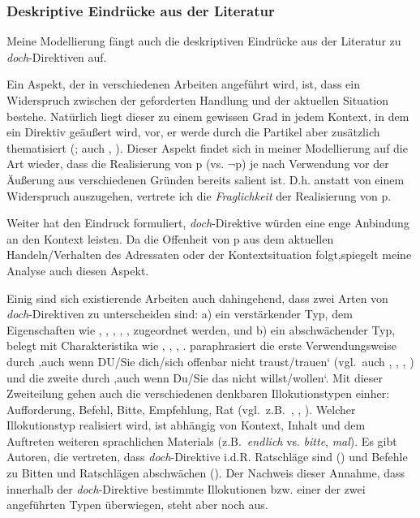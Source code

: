 \subsubsection{Deskriptive Eindrücke aus der Literatur}
Meine Modellierung fängt auch die deskriptiven Eindrücke aus der Literatur zu \textit{doch}-Direktiven auf. 

Ein Aspekt, der in verschiedenen Arbeiten angeführt wird, ist, dass ein Widerspruch zwischen der geforderten Handlung und der aktuellen Situation bestehe. Natürlich liegt dieser zu einem gewissen Grad in jedem Kontext, in dem ein Direktiv geäußert wird, vor, er werde durch die Partikel aber zusätzlich thematisiert (\citealt[139]{Hentschel1986}; auch \citealt[118]{Thurmair1989}, \citealt[214]{Kwon2005}). Dieser Aspekt findet sich in meiner Modellierung auf die Art wieder, dass die Realisierung von p (vs. $\neg$p) je nach Verwendung vor der Äußerung aus verschiedenen Gründen bereits salient ist. D.h. anstatt von einem Widerspruch auszugehen, vertrete ich die \emph{Fraglichkeit} der Realisierung von p.

Weiter hat \citet[139]{Hentschel1986} den Eindruck formuliert, \textit{doch}-Direktive würden eine enge Anbindung an den Kontext leisten. Da die Offenheit von p aus dem aktuellen Handeln/Verhalten des Adressaten oder der Kontextsituation folgt,\linebreak spiegelt meine Analyse auch diesen Aspekt.

Einig sind sich existierende Arbeiten auch dahingehend, dass zwei Arten von \textit{doch}-Direktiven zu unterscheiden sind: a) ein verstärkender Typ, dem Eigenschaften wie , , , , ,  zugeordnet werden, und b) ein abschwächender Typ, belegt mit Charakteristika wie , , , . \citet[191]{Rinas2006} paraphrasiert die erste Verwendungsweise durch ‚auch wenn DU\slash Sie dich\slash sich offenbar nicht traust/trauen‘ (vgl.\ auch \citealt[188]{Franck1980}, \citealt[139]{Hentschel1986}, \citealt[113]{Helbig1990}, \citealt[91--92, 214]{Kwon2005}) und die zweite durch ‚auch wenn Du\slash Sie das nicht willst/wollen‘. Mit dieser Zweiteilung gehen auch die verschiedenen denkbaren Illokutionstypen einher: Aufforderung, Befehl, Bitte, Empfehlung, Rat (vgl.\ z.B.\ \citealt[27]{Volmert1991}, \citealt[113]{Helbig1990}, \citealt[91--92, 214]{Kwon2005}). Welcher Illokutionstyp realisiert wird, ist abhängig von Kontext, Inhalt und dem Auftreten weiteren sprachlichen Materials (z.B.\ \textit{endlich} vs. \textit{bitte}, \textit{mal}). Es gibt Autoren, die vertreten, dass \textit{doch}-Direktive i.d.R. Ratschläge  sind (\citealt[402]{Ickler1994}) und Befehle  zu Bitten  und Ratschlägen abschwächen (\citealt[111]{Bublitz1978}). Der Nachweis dieser Annahme, dass innerhalb der \textit{doch}-Direktive bestimmte Illokutionen bzw. einer der zwei angeführten Typen überwiegen, steht aber noch aus.

